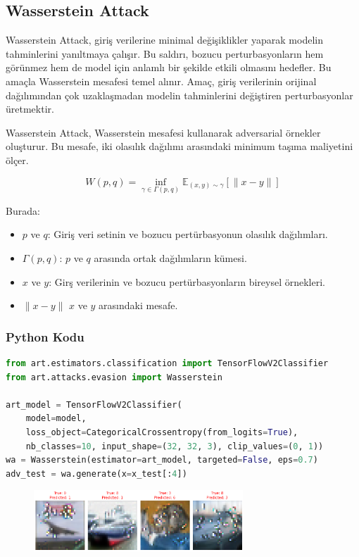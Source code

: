 \subsection{Wasserstein Attack}

Wasserstein Attack, giriş verilerine minimal değişiklikler yaparak modelin tahminlerini yanıltmaya çalışır. Bu saldırı, bozucu perturbasyonların hem görünmez hem de model için anlamlı bir şekilde etkili olmasını hedefler. Bu amaçla Wasserstein mesafesi temel alınır. Amaç, giriş verilerinin orijinal dağılımından çok uzaklaşmadan modelin tahminlerini değiştiren perturbasyonlar üretmektir.

Wasserstein Attack, Wasserstein mesafesi kullanarak adversarial örnekler oluşturur. Bu mesafe, iki olasılık dağılımı arasındaki minimum taşıma maliyetini ölçer.

\[ W(p, q) = \inf_{\gamma \in \Gamma(p, q)} \mathbb{E}_{(x, y) \sim \gamma}[\| x - y \|] \]

Burada:

\begin{itemize}
    \item $p$ ve $q$: Giriş veri setinin ve bozucu pertürbasyonun olasılık dağılımları.
    \item $\Gamma(p, q)$: $p$ ve $q$ arasında ortak dağılımların kümesi.
    \item $x$ ve $y$: Girş verilerinin ve bozucu pertürbasyonların bireysel örnekleri.
    \item $\| x - y \|$ $x$ ve $y$ arasındaki mesafe.
\end{itemize}

\subsubsection{Python Kodu}

\begin{lstlisting}[language=Python]
from art.estimators.classification import TensorFlowV2Classifier
from art.attacks.evasion import Wasserstein

art_model = TensorFlowV2Classifier(
    model=model,
    loss_object=CategoricalCrossentropy(from_logits=True), 
    nb_classes=10, input_shape=(32, 32, 3), clip_values=(0, 1))
wa = Wasserstein(estimator=art_model, targeted=False, eps=0.7)
adv_test = wa.generate(x=x_test[:4])
\end{lstlisting}

\begin{figure}[h]
    \centering
    \includegraphics[width=0.7\textwidth]{images/wasserstein_attack_results.png}
    \caption{}
\end{figure}

